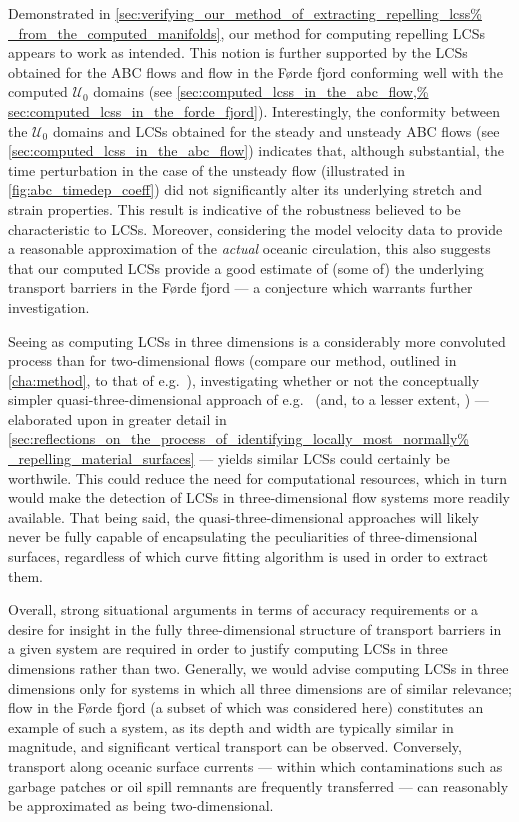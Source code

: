 Demonstrated in \cref{sec:verifying_our_method_of_extracting_repelling_lcss%
_from_the_computed_manifolds}, our method for computing repelling LCSs appears
to work as intended. This notion is further supported by the LCSs obtained for
the ABC flows and flow in the Førde fjord conforming well with the computed
$\mathcal{U}_{0}$ domains (see \cref{sec:computed_lcss_in_the_abc_flow,%
sec:computed_lcss_in_the_forde_fjord}). Interestingly, the conformity between
the $\mathcal{U}_{0}$ domains and LCSs obtained for the steady and unsteady ABC
flows (see \cref{sec:computed_lcss_in_the_abc_flow}) indicates that,
although substantial, the time perturbation in the case of the unsteady flow
(illustrated in \cref{fig:abc_timedep_coeff}) did not significantly alter its
underlying stretch and strain properties. This result is indicative of the
robustness believed to be characteristic to LCSs. Moreover, considering the
model velocity data to provide a reasonable approximation of the \emph{actual}
oceanic circulation, this also suggests that our computed LCSs provide a good
estimate of (some of) the underlying transport barriers in the Førde fjord ---
a conjecture which warrants further investigation.

Seeing as computing LCSs in three dimensions is a considerably more convoluted
process than for two-dimensional flows (compare our method, outlined in
\cref{cha:method}, to that of e.g.\ \textcite{loken2017sensitivity}),
investigating whether or not the conceptually simpler quasi-three-dimensional
approach of e.g.\ \textcite{blazevski2014hyperbolic} (and, to a lesser
extent, \textcite{oettinger2016autonomous}) --- elaborated upon in
greater detail in
\cref{sec:reflections_on_the_process_of_identifying_locally_most_normally%
_repelling_material_surfaces} --- yields similar LCSs could certainly be
worthwile. This could reduce the need for computational resources, which in
turn would make the detection of LCSs in three-dimensional flow systems more
readily available. That being said, the quasi-three-dimensional approaches will
likely never be fully capable of encapsulating the peculiarities of
three-dimensional surfaces, regardless of which curve fitting algorithm is used
in order to extract them.

Overall, strong situational arguments in terms of accuracy requirements or a
desire for insight in the fully three-dimensional structure of transport
barriers in a given system are required in order to justify computing LCSs in three
dimensions rather than two. Generally, we would advise computing LCSs in three
dimensions only for systems in which all three dimensions are of similar
relevance; flow in the Førde fjord (a subset of which was considered here)
constitutes an example of such a system, as its depth and width are typically
similar in magnitude, and significant vertical transport can be observed.
Conversely, transport along oceanic surface currents --- within which
contaminations such as garbage patches or oil spill remnants are frequently
transferred --- can reasonably be approximated as being two-dimensional.

